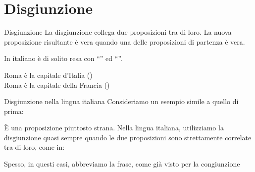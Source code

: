 \documentclass[aspectratio=169,10pt,dvipsnames,handout]{beamer}
\begin{document}
\section{Disgiunzione}

\begin{frame}{Disgiunzione}
    La \alert{disgiunzione} collega due proposizioni tra di loro. La nuova proposizione risultante è vera quando una delle proposizioni di partenza è vera. \medskip

    In italiano è di solito resa con ``'' ed ``''.
    \begin{example}
        \propshape
        Roma è la capitale d'Italia (\checkmark)\\
        Roma è la capitale della Francia (\xmark)\\
        \medskip

    \end{example}
\end{frame}

\begin{frame}{Disgiunzione nella lingua italiana}
    Consideriamo un esempio simile a quello di prima:
    \begin{example}
    \end{example}
    \pause
    È una proposizione piuttosto strana. Nella lingua italiana, utilizziamo la disgiunzione quasi sempre quando le due proposizioni sono strettamente correlate tra di loro, come in:
    \begin{example}
    \end{example}
    Spesso, in questi casi, abbreviamo la frase, come già visto per la congiunzione
    \begin{example}
    \end{example}
\end{frame}
\end{document}
